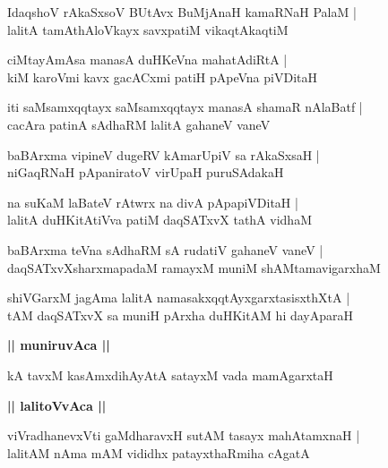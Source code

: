 \documentclass[twoside,12pt,openright]{book}
\newcounter{shloka}[chapter]
\def\uvaca#1{\centerline{{\large\textbf{#1}}}}
\begin{document}
\begin{shloka}%
IdaqshoV rAkaSxsoV BUtAvx BuMjAnaH kamaRNaH PalaM |\\
lalitA tamAthAloVkayx savxpatiM vikaqtAkaqtiM 
\end{shloka}

\begin{shloka}%
ciMtayAmAsa manasA duHKeVna mahatAdiRtA |\\
kiM karoVmi kavx gacACxmi patiH pApeVna piVDitaH 
\end{shloka}

\begin{shloka}%
iti saMsamxqqtayx saMsamxqqtayx manasA shamaR nAlaBatf |\\
cacAra patinA sAdhaRM lalitA gahaneV vaneV 
\end{shloka}

\begin{shloka}%
baBArxma vipineV dugeRV kAmarUpiV sa rAkaSxsaH |\\
niGaqRNaH pApaniratoV virUpaH puruSAdakaH 
\end{shloka}

\begin{shloka}%
na suKaM laBateV rAtwrx na divA pApapiVDitaH |\\
lalitA duHKitAtiVva patiM daqSATxvX tathA vidhaM 
\end{shloka}

\begin{shloka}%
baBArxma teVna sAdhaRM sA rudatiV gahaneV vaneV |\\
daqSATxvXsharxmapadaM ramayxM muniM shAMtamavigarxhaM 
\end{shloka}

\begin{shloka}%
shiVGarxM jagAma lalitA namasakxqqtAyxgarxtasisxthXtA |\\
tAM daqSATxvX sa muniH pArxha duHKitAM hi dayAparaH 
\end{shloka}

\uvaca{|| muniruvAca ||}

\begin{shloka}%
kA tavxM kasAmxdihAyAtA satayxM vada mamAgarxtaH 
\end{shloka}

\uvaca{|| lalitoVvAca ||}

\begin{shloka}%
viVradhanevxVti gaMdharavxH sutAM tasayx mahAtamxnaH |\\
lalitAM nAma mAM vididhx patayxthaRmiha cAgatA
\end{shloka}
\end{document}
